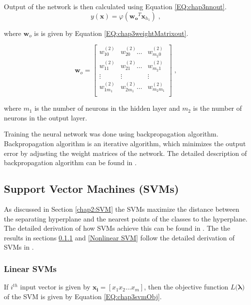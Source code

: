         Output of the network is then calculated using Equation \ref{EQ:chap3nnout}.
        \begin{equation}
       		y(\mathbf{x}) = \varphi(\mathbf{w_o}^T \mathbf{x}_{h_1}) \;,
        	\label{EQ:chap3nnout}
        \end{equation}        
        
        \noindent where $\mathbf{w}_o$ is is given by Equation \ref{EQ:chap3weightMatrixout}.

        \begin{equation}
        	\mathbf{w}_{o} = \begin{bmatrix}
        		w_{10}^{(2)} 	&w_{20}^{(2)} \ldots 	& w_{m_{2}0}^{(2)} \\
        		w_{11}^{(2)} 	&w_{21}^{(2)} \ldots 	& w_{m_{2}1}^{(2)} \\
            	\vdots     	&\vdots    			& \vdots \\
        		w_{1m_{1}}^{(2)} &w_{2m_{1}}^{(2)} \ldots &w_{m_{2}m_{1}}^{(2)} \\
        	\end{bmatrix} \;,
        	\label{EQ:chap3weightMatrixout}
        \end{equation}
        
        \noindent where $m_1$ is the number of neurons in the hidden layer and $m_2$ is the number of neurons in the output layer.
        
        
        Training the neural network was done using backpropagation algorithm. Backpropagation algorithm is an iterative algorithm, which minimizes the output error by adjusting the weight matrices of the network. The detailed description of backpropagation algorithm can be found in \cite{duda2001pattern}.
        
\subsection{Support Vector Machines (SVMs)}
\label{Support Vector Machines}
	As discussed in Section \ref{chap2:SVM} the SVMs maximize the distance between the separating hyperplane and the nearest points of the classes to the hyperplane. The detailed derivation of how SVMs achieve this can be found in \cite{snyder2010machine}. The the results in sections \ref{Linear SVM} and \ref{Nonlinear SVM} follow the detailed derivation of SVMs in \cite{snyder2010machine}.
    
    \subsubsection{Linear SVMs}
    \label{Linear SVM}
    If $i^{th}$ input vector is given by $\mathbf{x_i} = [x_1 x_2 \ldots x_m]$, then the objective function $L(\mathbf{\lambda)}$ of the SVM is given by Equation \ref{EQ:chap3svmObj}.
    
